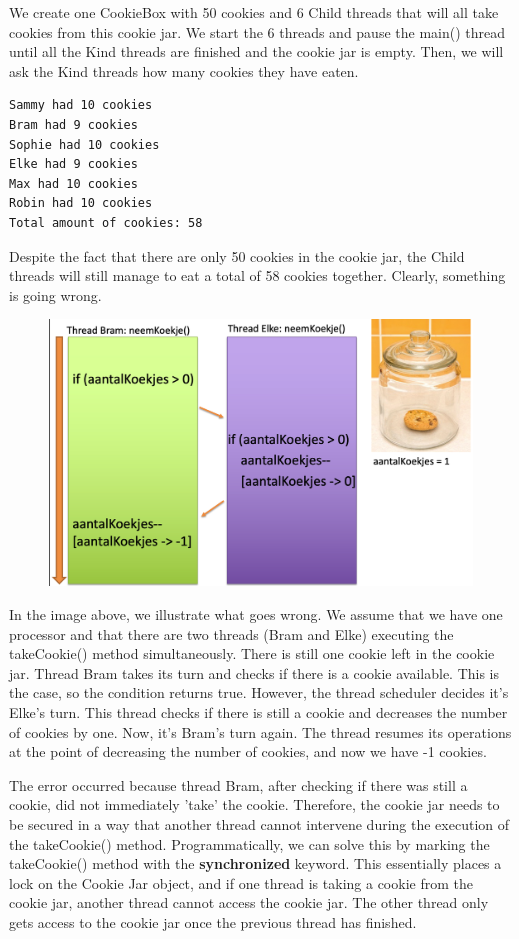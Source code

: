 We create one CookieBox with 50 cookies and 6 Child threads that will all take cookies from this cookie jar. We start the 6 threads and pause the main() thread until all the Kind threads are finished and the cookie jar is empty. Then, we will ask the Kind threads how many cookies they have eaten.

\begin{verbatim}
Sammy had 10 cookies
Bram had 9 cookies
Sophie had 10 cookies
Elke had 9 cookies
Max had 10 cookies
Robin had 10 cookies
Total amount of cookies: 58
\end{verbatim}

Despite the fact that there are only 50 cookies in the cookie jar, the Child threads will still manage to eat a total of 58 cookies together. Clearly, something is going wrong.

\begin{figure}[H]
  \includegraphics[width=\linewidth]{images/h9/koekjesdoos.png}
  \label{fig:concurrent_access}
\end{figure}

In the image above, we illustrate what goes wrong.
We assume that we have one processor and that there are two threads (Bram and Elke) executing the takeCookie() method simultaneously. There is still one cookie left in the cookie jar.
Thread Bram takes its turn and checks if there is a cookie available. This is the case, so the condition returns true. However, the thread scheduler decides it's Elke's turn. This thread checks if there is still a cookie and decreases the number of cookies by one. Now, it's Bram's turn again. The thread resumes its operations at the point of decreasing the number of cookies, and now we have -1 cookies.

The error occurred because thread Bram, after checking if there was still a cookie, did not immediately 'take' the cookie.
Therefore, the cookie jar needs to be secured in a way that another thread cannot intervene during the execution of the takeCookie() method.
Programmatically, we can solve this by marking the takeCookie() method with the \textbf{synchronized} keyword. This essentially places a lock on the Cookie Jar object, and if one thread is taking a cookie from the cookie jar, another thread cannot access the cookie jar. The other thread only gets access to the cookie jar once the previous thread has finished.

